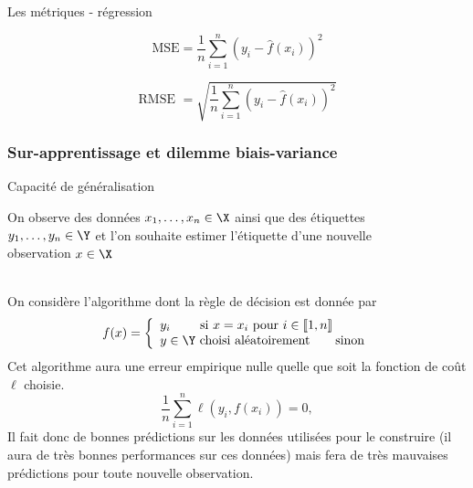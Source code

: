 \documentclass[10pt]{beamer}
\newcommand{\hsp}{\hspace*{1em}}
\begin{document}
\begin{frame}{Les métriques - régression}
	
	$$ \text{MSE} = \dfrac{1}{n} \sum_{i=1}^n \left(y_i - \widehat{f}(x_i)\right)^2$$
	
	\vspace*{3em}
	
	$$ \text{RMSE } = \sqrt{\dfrac{1}{n} \sum_{i=1}^n \left(y_i - \widehat{f}(x_i)\right)^2}$$
\end{frame}

\subsubsection{Sur-apprentissage et dilemme biais-variance}

\begin{frame}{Capacité de généralisation}
	
		 \hsp On observe des {données} $x_1,\dots,x_n \in \X$ ainsi que des {étiquettes}\\
	\phantom{\bftitle{Objectif} \hsp}$y_1,\dots,y_n \in \Y $ et l'on souhaite estimer l'étiquette d'une nouvelle\\\phantom{\bftitle{Objectif} \hsp} observation $x \in \X$\\[1em]
	
	\\
	\vspace*{-0.2em}
	\begin{vexblock}{}
	On considère l'algorithme dont la règle de décision est donnée par 
	$$ f(x) = \left\{\begin{array}{l}
		y_i \hsp \hsp  \text{ si } x=x_i  \text{ pour }   i \in \llbracket1,n \rrbracket\\
		y \in \Y \text{ choisi aléatoirement} \hsp \hsp  \text{sinon}		
	\end{array} \right.$$ 
Cet algorithme aura
	une erreur empirique nulle quelle que soit la fonction de coût $\ell$ choisie.
	$$\dfrac{1}{n} \sum_{i=1}^n \ell\left(y_i, f(x_i)\right) = 0,$$ 
	Il fait donc de bonnes prédictions sur les données utilisées pour le construire (il aura de très bonnes performances sur ces données) mais fera de très mauvaises prédictions pour toute nouvelle observation.
	\end{vexblock}
	
\end{frame}
\end{document}
